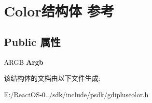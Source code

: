 \hypertarget{struct_color}{}\section{Color结构体 参考}
\label{struct_color}
\subsection*{Public 属性}
\begin{DoxyCompactItemize}
\item 
\mbox{\label{struct_color_aae174ef9a27eb84b136c2a650d854f6b}} 
A\+R\+GB {\bfseries Argb}
\end{DoxyCompactItemize}


该结构体的文档由以下文件生成\+:\begin{DoxyCompactItemize}
\item 
E\+:/\+React\+O\+S-\/0../sdk/include/psdk/gdipluscolor.\+h\end{DoxyCompactItemize}
